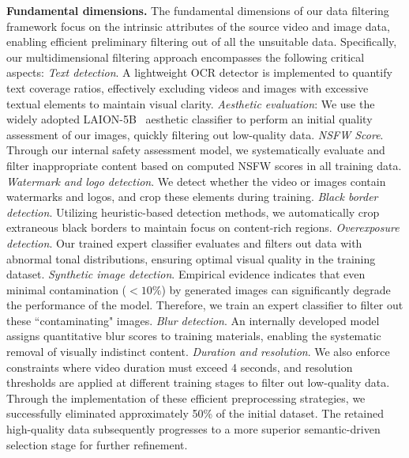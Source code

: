 \textbf{Fundamental dimensions.} 
%
The fundamental dimensions of our data filtering framework focus on the intrinsic attributes of the source video and image data, enabling efficient preliminary filtering out of all the unsuitable data.
%
Specifically, our multidimensional filtering approach encompasses the following critical aspects:
%
\emph{Text detection}. A lightweight OCR detector is implemented to quantify text coverage ratios, effectively excluding videos and images with excessive textual elements to maintain visual clarity.
%
\emph{Aesthetic evaluation}: We use the widely adopted LAION-5B~\citep{schuhmann2021laion} aesthetic classifier to perform an initial quality assessment of our images, quickly filtering out low-quality data.
%
\emph{NSFW Score}. Through our internal safety assessment model, we systematically evaluate and filter inappropriate content based on computed NSFW scores in all training data.
%
\emph{Watermark and logo detection}. We detect whether the video or images contain watermarks and logos, and crop these elements during training.
%
\emph{Black border detection}. Utilizing heuristic-based detection methods, we automatically crop extraneous black borders to maintain focus on content-rich regions.
%
\emph{Overexposure detection}. Our trained expert classifier evaluates and filters out data with abnormal tonal distributions, ensuring optimal visual quality in the training dataset.
%
\emph{Synthetic image detection}. Empirical evidence indicates that even minimal contamination ($<10\%$) by generated images can significantly degrade the performance of the model. Therefore, we train an expert classifier to filter out these ``contaminating" images.
%
\emph{Blur detection}. An internally developed model assigns quantitative blur scores to training materials, enabling the systematic removal of visually indistinct content.
%
\emph{Duration and resolution}. We also enforce constraints where video duration must exceed 4 seconds, and resolution thresholds are applied at different training stages to filter out low-quality data.
%
Through the implementation of these efficient preprocessing strategies, we successfully eliminated approximately 50\% of the initial dataset. 
%
The retained high-quality data subsequently progresses to a more superior semantic-driven selection stage for further refinement.


